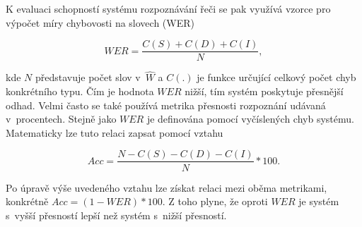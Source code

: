 \noindent K evaluaci schopností systému rozpoznávání řeči se pak využívá vzorce pro výpočet míry chybovosti na slovech (WER)

\begin{equation}
  WER = \frac{C(S) + C(D) + C(I)}{N},
  \label{eq:asr:decoding:wer}
\end{equation}

\noindent kde $N$ představuje počet slov v~$\hat{W}$ a $C(.)$ je funkce určující celkový počet chyb konkrétního typu. Čím je hodnota $WER$ nižší, tím systém poskytuje přesnější odhad. Velmi často se také používá metrika přesnosti rozpoznání udávaná v~procentech. Stejně jako $WER$ je definována pomocí vyčíslených chyb systému. Matematicky lze tuto relaci zapsat pomocí vztahu

\begin{equation}
  Acc = \frac{N - C(S) - C(D) - C(I)}{N} * 100.
  \label{eq:asr:decoding:acc}
\end{equation}

\noindent Po úpravě výše uvedeného vztahu lze získat relaci mezi oběma metrikami, konkrétně $Acc = \left(1 - WER\right) * 100$. Z toho plyne, že oproti $WER$ je systém s~vyšší přesností lepší než systém s~nižší přesností.
